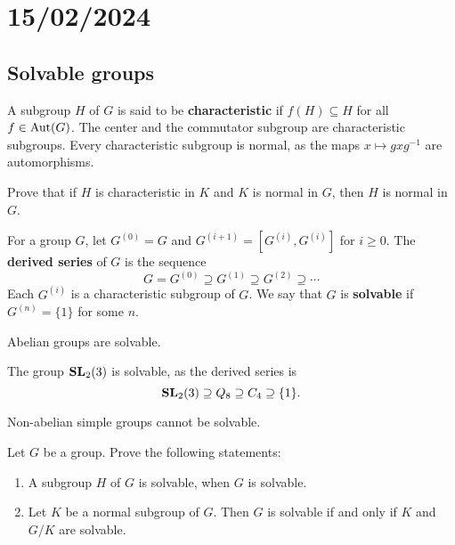\section{15/02/2024}

\subsection{Solvable groups}

A subgroup $H$ of $G$ is said to be \textbf{characteristic} if 
$f(H)\subseteq H$ for all $f\in\operatorname{Aut}(G)$. 
The center and the commutator subgroup are
characteristic subgroups. 
Every characteristic subgroup is normal, 
as the maps $x\mapsto gxg^{-1}$ are automorphisms. 

\begin{exercise}
    Prove that if $H$ is characteristic in $K$ and $K$ is normal in $G$, then
    $H$ is normal in $G$. 
\end{exercise}

For a group $G$, let 
$G^{(0)}=G$ and 
$G^{(i+1)}=[G^{(i)},G^{(i)}]$ for $i\geq0$.
The \textbf{derived series} of $G$ is the sequence
\[
G=G^{(0)}\supseteq G^{(1)}\supseteq G^{(2)}\supseteq\cdots
\]
Each $G^{(i)}$ is a characteristic subgroup of $G$. We say that 
$G$ is \textbf{solvable} if $G^{(n)}=\{1\}$ for some $n$.  

\begin{example}
	Abelian groups are solvable. 
\end{example}

\begin{example}
	The group $\mathbf{SL}_2(3)$ is solvable, as the derived series is 
	\[
	\mathbf{SL}_2(3)\supseteq Q_8\supseteq C_4\supseteq \{1\}.
	\]
\end{example}

\begin{example}
	Non-abelian simple groups cannot be solvable. 
\end{example}

\begin{exercise}
	\label{xca:solvable}
	Let $G$ be a group. Prove the following statements:
	\begin{enumerate}
		\item A subgroup $H$ of $G$ is solvable, when $G$ is solvable.
		\item Let $K$ be a normal subgroup of $G$. 
		    Then $G$ is solvable if and only if $K$ and $G/K$ are solvable.
	\end{enumerate}
\end{exercise}

